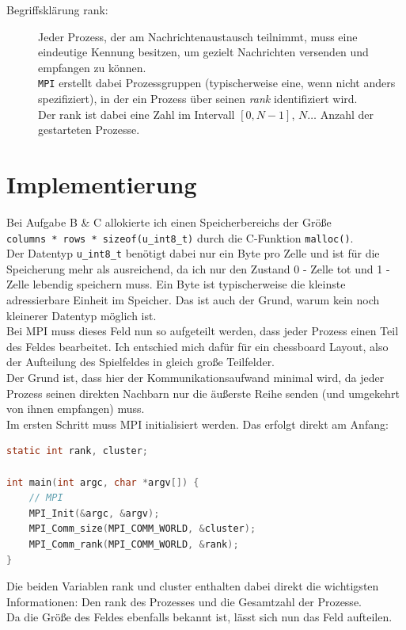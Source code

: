 \documentclass[german,plainarticle,hyperref,utf8]{zihpub}
\begin{document}
	\begin{description}
		\item[Begriffsklärung rank:] Jeder Prozess, der am Nachrichtenaustausch teilnimmt, muss eine eindeutige Kennung besitzen, um gezielt Nachrichten versenden und empfangen zu können.\\ \texttt{MPI} erstellt dabei Prozessgruppen (typischerweise eine, wenn nicht anders spezifiziert), in der ein Prozess über seinen \textit{rank} identifiziert wird.\\ Der rank ist dabei eine Zahl im Intervall $\left[0, N-1\right]$, $N\dotso$ Anzahl der gestarteten Prozesse.
		
	\end{description}
	\newpage
	\section{Implementierung}
	Bei Aufgabe B \& C allokierte ich einen Speicherbereichs der Größe\\ \texttt{columns * rows * sizeof(u\_int8\_t)} durch die C-Funktion \texttt{malloc()}.\\
	Der Datentyp \texttt{u\_int8\_t} benötigt dabei nur ein Byte pro Zelle und ist für die Speicherung mehr als ausreichend, da ich nur den Zustand 0 - Zelle tot und 1 - Zelle lebendig speichern muss. Ein Byte ist typischerweise die kleinste adressierbare Einheit im Speicher. Das ist auch der Grund, warum kein noch kleinerer Datentyp möglich ist.\\
	Bei MPI muss dieses Feld nun so aufgeteilt werden, dass jeder Prozess einen Teil des Feldes bearbeitet. Ich entschied mich dafür für ein chessboard Layout, also der Aufteilung des Spielfeldes in gleich große Teilfelder.\\
	Der Grund ist, dass hier der Kommunikationsaufwand minimal wird, da jeder Prozess seinen direkten Nachbarn nur die äußerste Reihe senden (und umgekehrt von ihnen empfangen) muss.\\
	Im ersten Schritt muss MPI initialisiert werden. Das erfolgt direkt am Anfang:
	\begin{lstlisting}[language=C, caption=MPI Initialisierung mit Bestimmung von rank und cluster]
static int rank, cluster;

int main(int argc, char *argv[]) {
	// MPI
	MPI_Init(&argc, &argv);
	MPI_Comm_size(MPI_COMM_WORLD, &cluster);
	MPI_Comm_rank(MPI_COMM_WORLD, &rank);
}\end{lstlisting}

	Die beiden Variablen rank und cluster enthalten dabei direkt die wichtigsten Informationen: Den rank des Prozesses und die Gesamtzahl der Prozesse.\\
	Da die Größe des Feldes ebenfalls bekannt ist, lässt sich nun das Feld aufteilen.\\
	
\end{document}
